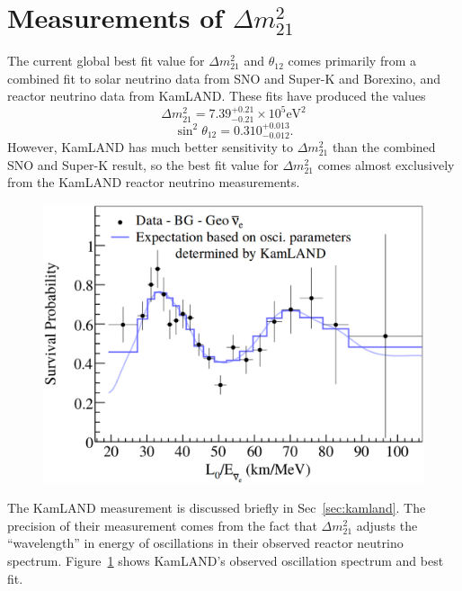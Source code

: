 \section{Measurements of \textbf{$\Delta m^{2}_{21}$}}
\label{sec:dm21_tension}
The current global best fit value for  $\Delta m^{2}_{21}$ and
$\theta_{12}$ comes
primarily from a combined fit to solar neutrino data from SNO
and Super-K and Borexino, and reactor neutrino data from KamLAND\@.
These fits have produced the values
\begin{equation}
    \Delta m^{2}_{21} = 7.39^{+0.21}_{-0.21}\times10^5 \text{eV}^{2}
\end{equation}
\begin{equation}
    \sin^2\theta_{12} = 0.310^{+0.013}_{-0.012}\text{.}
\end{equation}
However, KamLAND has much better sensitivity to $\Delta m^{2}_{21}$
than the combined SNO and Super-K result, so the best fit value for
$\Delta m^{2}_{21}$ comes almost exclusively from the KamLAND
reactor neutrino measurements.
\begin{figure}[htbp]
    \centering
    \includegraphics[width=\textwidth]{kamland_oscillation}
    \caption[]{}
    \label{fig:kamland_oscillation}
\end{figure}
The KamLAND measurement is discussed briefly in Sec~\ref{sec:kamland}.
The precision of their measurement comes from the fact that $\Delta m^{2}_{21}$
adjusts the ``wavelength'' in energy of oscillations in their observed
reactor neutrino spectrum.
Figure~\ref{fig:kamland_oscillation} shows KamLAND's observed oscillation
spectrum and best fit.

